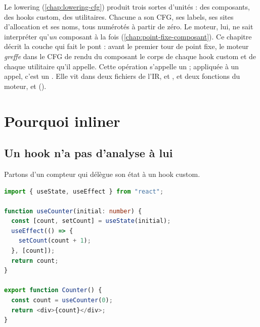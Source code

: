 
Le lowering (\cref{chap:lowering-cfg}) produit trois sortes d'unités : des composants, des hooks custom, des utilitaires. Chacune a son CFG, ses labels, ses sites d'allocation et ses noms, tous numérotés à partir de zéro. Le moteur, lui, ne sait interpréter qu'\emph{un} composant à la fois (\cref{chap:point-fixe-composant}). Ce chapitre décrit la couche qui fait le pont : avant le premier tour de point fixe, le moteur \emph{greffe} dans le CFG de rendu du composant le corps de chaque hook custom et de chaque utilitaire qu'il appelle. Cette opération s'appelle un  ; appliquée à un appel, c'est un . Elle vit dans deux fichiers de l'IR,  et , et deux fonctions du moteur,  et  ().

\section{Pourquoi inliner}
\label{sec:splice-pourquoi}

\subsection{Un hook n'a pas d'analyse à lui}

Partons d'un compteur qui délègue son état à un hook custom.

\begin{lstlisting}[language=TypeScript,caption={Un hook custom qui boucle (\file{/tmp/ch08/hook/Counter.tsx})},label={lst:splice-counter}]
import { useState, useEffect } from "react";

function useCounter(initial: number) {
  const [count, setCount] = useState(initial);
  useEffect(() => {
    setCount(count + 1);
  }, [count]);
  return count;
}

export function Counter() {
  const count = useCounter(0);
  return <div>{count}</div>;
}
\end{lstlisting}

